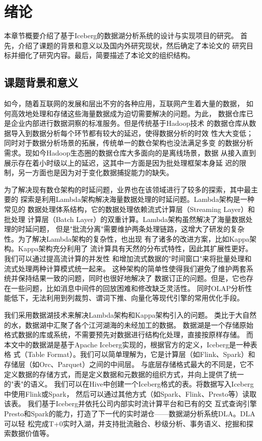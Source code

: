 
\chapter{绪论}

本章节概要介绍了基于Iceberg的数据湖分析系统的设计与实现项目的研究。
首先，介绍了课题的背景和意义以及国内外研究现状，然后确定了本论文的
研究目标并细化了研究内容。最后，简要描述了本论文的组织结构。

\section{课题背景和意义}

如今，随着互联网的发展和层出不穷的各种应用，互联网产生着大量的数据，
如何高效地处理和存储这些海量数据成为迫切需要解决的问题\cite{1}。为此，
数据仓库已是企业内部进行数据洞察的标准服务。但是传统基于Hadoop技术\cite{2}
的数据仓库从数据导入到数据分析每个环节都有较大的延迟，使得数据分析的时效
性大大变低；同时对于数据分析场景的拓展，传统单一的数仓架构也没法满足多变
的数据分析需求。现如今Hadoop生态圈的数据仓库大多面向的是离线场景，数据
从接入直到展示存在着小时级以上的延迟，这其中一方面是因为批处理框架本身延
迟的限制，另一方面也是因为对于变化数据捕捉能力的缺失。

为了解决现有数仓架构的时延问题，业界也在该领域进行了较多的探索，其中最主要的
探索是利用Lambda架构\cite{3}解决海量数据处理的时延问题。Lambda架构是一种常见的
数据处理体系结构，它的数据处理依赖流式计算层（Streaming Layer）和批处理
计算层（Batch Layer）的双重计算。Lambda架构虽然解决了海量数据处理的时延问题，
但是"批流分离"需要维护两条处理链路，这增大了研发的复杂性。为了解决Lambda架构的复杂性，也出现
有了诸多的改进方案，比如Kappa架构\cite{4}。Kappa架构充分利用了
流计算具有天然的分布式特性，因此其扩展性更好。我们可以通过提高流计算的并发性
和增加流式数据的"时间窗口"来将批量处理和流式处理两种计算模式统一起来。
这种架构的简单性使得我们避免了维护两套系统并保持结果一致的问题，同时也很好地解决了
数据订正的问题。但是，它也存在一些问题，比如消息中间件的回放困难和修改缺乏灵活性。
同时OLAP分析性能低下，无法利用到列裁剪、谓词下推、向量化等现代引擎的常用优化手段。

我们采用数据湖技术来解决Lambda架构和Kappa架构引入的问题。
类比于大自然的水，数据湖中汇聚了各个江河湖海的未经加工的数据。
数据湖是一个存储原始格式数据的库或系统，不需要预先对数据进行结构化处理，直接按原样存储\cite{5,6,7,8}。
而本文中的数据湖是基于Apache Iceberg实现的，根据官方的定义，Iceberg是一种表格
式（Table Format）。我们可以简单理解为，它是计算层（如Flink、Spark）和存储层（如Orc\cite{9}、Parquet\cite{10}）之间的中间层。
与底层存储格式最大的不同是，它不定义数据的存储方式，而是定义数据和元数据的组织方式，并向上提供了统一的"表"的语义。
我们可以在Hive中创建一个Iceberg格式的表。将数据写入Iceberg中使用Flink或Spark，
然后可以通过其他方式（如Spark、Flink、Presto\cite{11}等）读取该表。
我们基于Iceberg并依托公司内部实时流计算平台和已有的交
互式查询引擎Presto和Spark的能力，打造了下一代的实时湖仓——数据湖分析系统DLA。DLA可以轻
松完成T+0实时入湖，并支持批流融合、秒级分析、事务语义、挖掘和探索数据价值等。

